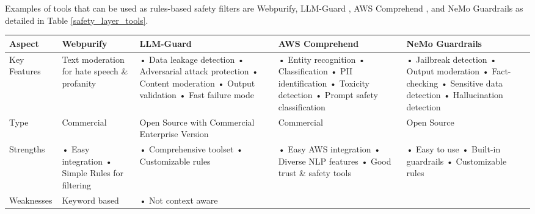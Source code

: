 Examples of tools that can be used as rules-based safety filters are Webpurify, LLM-Guard , AWS Comprehend , and NeMo Guardrails  as detailed in Table \ref{safety_layer_tools}.

\begin{table*}[h!]
\caption{Rules-Based Safety Filtering Tools}
\label{safety_layer_tools}
\begin{tabular}{|p{}|p{}|p{}|p{}|p{}|}
\hline
\textbf{Aspect} & \textbf{Webpurify} & \textbf{LLM-Guard} & \textbf{AWS Comprehend} & \textbf{NeMo Guardrails} \\
\hline
Key Features & Text moderation for hate speech \& profanity & • Data leakage detection \newline
• Adversarial attack protection \newline
• Content moderation \newline
• Output validation \newline
• Fast failure mode & • Entity recognition \newline
• Classification \newline
• PII identification \newline
• Toxicity detection \newline
• Prompt safety classification & • Jailbreak detection \newline
• Output moderation \newline
• Fact-checking \newline
• Sensitive data detection \newline
• Hallucination detection \\
\hline
Type & Commercial & Open Source with Commercial Enterprise Version & Commercial & Open Source \\
\hline
Strengths & • Easy integration \newline
• Simple Rules for filtering & • Comprehensive toolset \newline
• Customizable rules & • Easy AWS integration \newline
• Diverse NLP features \newline
• Good trust \& safety tools & • Easy to use \newline
• Built-in guardrails \newline
• Customizable rules \\
\hline
Weaknesses & Keyword based & • Not context aware \newline

\end{tabular}
\end{table*}
